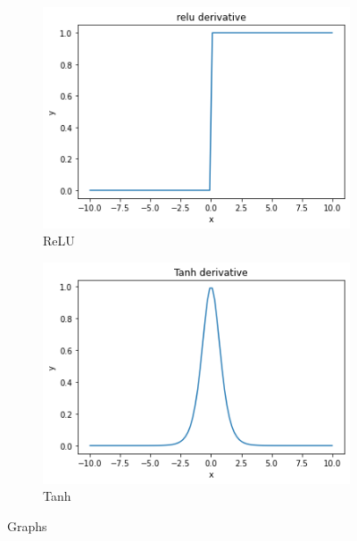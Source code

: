 \documentclass{article}
\begin{document}
\begin{itemize}
\begin{figure}[H]
\begin{subfigure}[b]{0.45\textwidth}
          \label{fig:LeakyReLU}
        \end{subfigure}
        \newline %
        \begin{subfigure}[b]{0.45\textwidth} %
          \includegraphics[width=\textwidth]{relu.png}
          \caption{ReLU}
          \label{fig:ReLU}
        \end{subfigure}
        \hfill %
        \begin{subfigure}[b]{0.45\textwidth} %
          \includegraphics[width=\textwidth]{tanh.png}
          \caption{Tanh}
          \label{fig:Tanh}
        \end{subfigure}
        \caption{Graphs}
        \label{fig:activation_functions}
      \end{figure}
      


\end{itemize}
\end{document}
